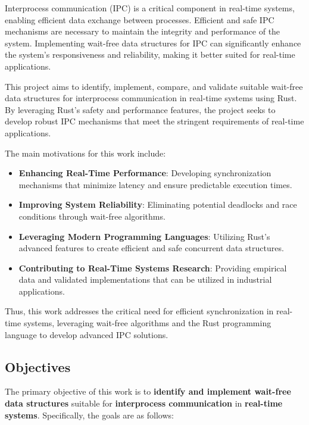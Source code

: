 \documentclass[ a4paper,
                toc=bibliography
              ]{scrartcl}
\begin{document}
Interprocess communication (IPC) is a critical component in real-time systems, enabling efficient data exchange between processes. Efficient and safe IPC mechanisms are necessary to maintain the integrity and performance of the system. Implementing wait-free data structures for IPC can significantly enhance the system's responsiveness and reliability, making it better suited for real-time applications. \cite{timnat2014practical, michael1996simple, huang2002improvingWaitFree,pellegrini2020relevancewaitfreecoordinationalgorithms}

This project aims to identify, implement, compare, and validate suitable wait-free data structures for interprocess communication in real-time systems using Rust. By leveraging Rust's safety and performance features, the project seeks to develop robust IPC mechanisms that meet the stringent requirements of real-time applications.

The main motivations for this work include:

\begin{itemize}
	\item \textbf{Enhancing Real-Time Performance}: Developing synchronization mechanisms that minimize latency and ensure predictable execution times.
	\item \textbf{Improving System Reliability}: Eliminating potential deadlocks and race conditions through wait-free algorithms.
	\item \textbf{Leveraging Modern Programming Languages}: Utilizing Rust's advanced features to create efficient and safe concurrent data structures.
	\item \textbf{Contributing to Real-Time Systems Research}: Providing empirical data and validated implementations that can be utilized in industrial applications.
\end{itemize}

Thus, this work addresses the critical need for efficient synchronization in real-time systems, leveraging wait-free algorithms and the Rust programming language to develop advanced IPC solutions.

\subsection{Objectives}

The primary objective of this work is to \textbf{identify and implement wait-free data structures} suitable for \textbf{interprocess communication} in \textbf{real-time systems}. Specifically, the goals are as follows:
\end{document}
